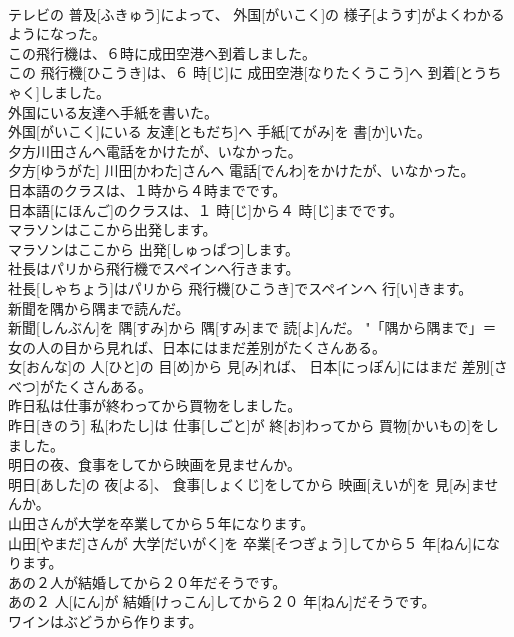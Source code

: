 \documentclass[8pt]{extreport}
\begin{document}
\begin{CJK}{UTF8}{min}
\\	テレビの 普及[ふきゅう]によって、 外国[がいこく]の 様子[ようす]がよくわかるようになった。	
\\	この飛行機は、６時に成田空港へ到着しました。	
\\	この 飛行機[ひこうき]は、６ 時[じ]に 成田空港[なりたくうこう]へ 到着[とうちゃく]しました。	
\\	外国にいる友達へ手紙を書いた。	
\\	外国[がいこく]にいる 友達[ともだち]へ 手紙[てがみ]を 書[か]いた。	
\\	夕方川田さんへ電話をかけたが、いなかった。	
\\	夕方[ゆうがた] 川田[かわた]さんへ 電話[でんわ]をかけたが、いなかった。	
\\	日本語のクラスは、１時から４時までです。	
\\	日本語[にほんご]のクラスは、１ 時[じ]から４ 時[じ]までです。	
\\	マラソンはここから出発します。	
\\	マラソンはここから 出発[しゅっぱつ]します。	
\\	社長はパリから飛行機でスペインへ行きます。	
\\	社長[しゃちょう]はパリから 飛行機[ひこうき]でスペインへ 行[い]きます。	
\\	新聞を隅から隅まで読んだ。	
\\	新聞[しんぶん]を 隅[すみ]から 隅[すみ]まで 読[よ]んだ。	"「隅から隅まで」＝ 
\\	女の人の目から見れば、日本にはまだ差別がたくさんある。	
\\	女[おんな]の 人[ひと]の 目[め]から 見[み]れば、 日本[にっぽん]にはまだ 差別[さべつ]がたくさんある。	
\\	昨日私は仕事が終わってから買物をしました。	
\\	昨日[きのう] 私[わたし]は 仕事[しごと]が 終[お]わってから 買物[かいもの]をしました。	
\\	明日の夜、食事をしてから映画を見ませんか。	
\\	明日[あした]の 夜[よる]、 食事[しょくじ]をしてから 映画[えいが]を 見[み]ませんか。	
\\	山田さんが大学を卒業してから５年になります。	
\\	山田[やまだ]さんが 大学[だいがく]を 卒業[そつぎょう]してから５ 年[ねん]になります。	
\\	あの２人が結婚してから２０年だそうです。	
\\	あの２ 人[にん]が 結婚[けっこん]してから２０ 年[ねん]だそうです。	
\\	ワインはぶどうから作ります。	

\end{CJK}
\end{document}
